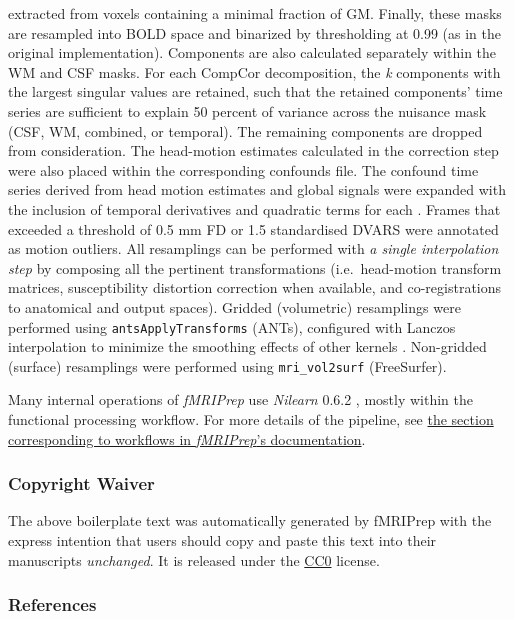 \documentclass[]{article}
\begin{document}
\begin{description}
extracted from voxels containing a minimal fraction of GM. Finally,
these masks are resampled into BOLD space and binarized by thresholding
at 0.99 (as in the original implementation). Components are also
calculated separately within the WM and CSF masks. For each CompCor
decomposition, the \emph{k} components with the largest singular values
are retained, such that the retained components' time series are
sufficient to explain 50 percent of variance across the nuisance mask
(CSF, WM, combined, or temporal). The remaining components are dropped
from consideration. The head-motion estimates calculated in the
correction step were also placed within the corresponding confounds
file. The confound time series derived from head motion estimates and
global signals were expanded with the inclusion of temporal derivatives
and quadratic terms for each \citep{confounds_satterthwaite_2013}.
Frames that exceeded a threshold of 0.5 mm FD or 1.5 standardised DVARS
were annotated as motion outliers. All resamplings can be performed with
\emph{a single interpolation step} by composing all the pertinent
transformations (i.e.~head-motion transform matrices, susceptibility
distortion correction when available, and co-registrations to anatomical
and output spaces). Gridded (volumetric) resamplings were performed
using \texttt{antsApplyTransforms} (ANTs), configured with Lanczos
interpolation to minimize the smoothing effects of other kernels
\citep{lanczos}. Non-gridded (surface) resamplings were performed using
\texttt{mri\_vol2surf} (FreeSurfer).
\end{description}

Many internal operations of \emph{fMRIPrep} use \emph{Nilearn} 0.6.2
\citep[RRID:SCR\_001362]{nilearn}, mostly within the functional
processing workflow. For more details of the pipeline, see
\href{https://fmriprep.readthedocs.io/en/latest/workflows.html}{the
section corresponding to workflows in \emph{fMRIPrep}'s documentation}.

\hypertarget{copyright-waiver}{%
\subsubsection{Copyright Waiver}\label{copyright-waiver}}

The above boilerplate text was automatically generated by fMRIPrep with
the express intention that users should copy and paste this text into
their manuscripts \emph{unchanged}. It is released under the
\href{https://creativecommons.org/publicdomain/zero/1.0/}{CC0} license.

\hypertarget{references}{%
\subsubsection{References}\label{references}}


\end{document}
